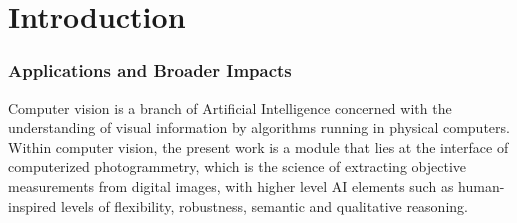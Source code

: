 \newpage
\pagestyle{fancy}
\fancyhf{}
\fancyhead[LE]{\nouppercase{\leftmark}}
\fancyhead[RE]{\thepage}
\fancyhead[LO]{\nouppercase{\rightmark}}
\fancyhead[RO]{\thepage}
\fancyfoot[LE,LO,RE,RO]{\thepage}
\mynewpage
\chapter{Introduction}\label{sec:intro}

\subsection{Applications and Broader Impacts}

Computer vision is a branch of Artificial Intelligence concerned with the
understanding of visual information by algorithms running in physical computers.
Within computer vision, the present work is a module that lies at the interface
of computerized photogrammetry, which is the science of extracting objective
measurements from digital images, with higher level AI elements such as
human-inspired levels of flexibility, robustness, semantic and qualitative reasoning. 

